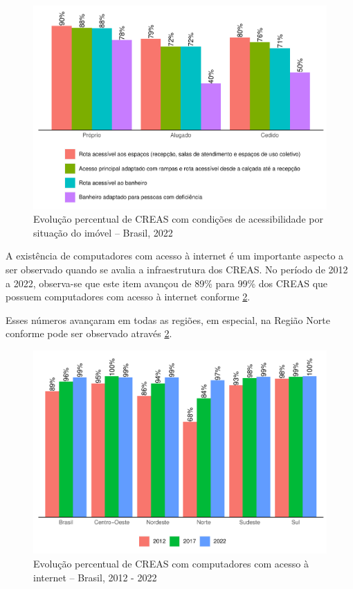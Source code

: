 \documentclass[
  brazilian]{report}
\begin{document}
\begin{figure}
\includegraphics{Censo-SUAS-2022_files/figure-latex/CREAS-acessibilidade-situacao-1} \caption[Evolução percentual de CREAS com condições de acessibilidade por situação do imóvel – Brasil, 2022]{Evolução percentual de CREAS com condições de acessibilidade por situação do imóvel – Brasil, 2022}\label{fig:CREAS-acessibilidade-situacao}
\end{figure}

A existência de computadores com acesso à internet é um importante
aspecto a ser observado quando se avalia a infraestrutura dos CREAS. No
período de 2012 a 2022, observa-se que este item avançou de 89\% para
99\% dos CREAS que possuem computadores com acesso à internet conforme
\cref{fig:CREAS-internet-percentual}.

Esses números avançaram em todas as regiões, em especial, na Região
Norte conforme pode ser observado através
\cref{fig:CREAS-internet-percentual}.

\begin{figure}
\includegraphics{Censo-SUAS-2022_files/figure-latex/CREAS-internet-percentual-1} \caption[Evolução percentual de CREAS com computadores com acesso à internet – Brasil, 2012 - 2022]{Evolução percentual de CREAS com computadores com acesso à internet – Brasil, 2012 - 2022}\label{fig:CREAS-internet-percentual}
\end{figure}
\end{document}
